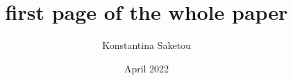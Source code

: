 \documentclass[11pt]{report}
\title{first page of the whole paper}
\author{Konstantina Saketou}
\date{April 2022}
\begin{document}
\maketitle



\nocite{*}





\end{document}

